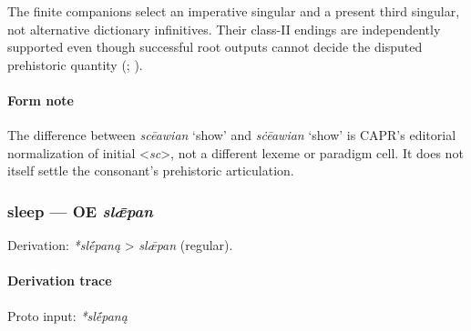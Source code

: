 \documentclass[
  british,
  a4paper,
]{article}
\begin{document}
The finite companions select an imperative singular and a present third
singular, not alternative dictionary infinitives. Their class-II endings
are independently supported even though successful root outputs cannot
decide the disputed prehistoric quantity
(;
).

\paragraph{Form note}\label{form-note-15}

The difference between {\emph{scēawian}} `show' and {\emph{sċēawian}}
`show' is CAPR's editorial normalization of initial
\textless{}\emph{sc}\textgreater, not a different lexeme or paradigm
cell. It does not itself settle the consonant's prehistoric
articulation.

\subsubsection{\texorpdfstring{sleep --- OE
\emph{slǣpan}}{sleep --- OE slǣpan}}\label{sleep-oe-slux1e3pan}

Derivation: \emph{*slḗpaną} \textgreater{} \emph{slǣpan} (regular).

\paragraph{Derivation trace}\label{derivation-trace-70}

Proto input: \emph{*slḗpaną}

\begingroup
\setlength{\fboxsep}{6pt}
\end{document}
